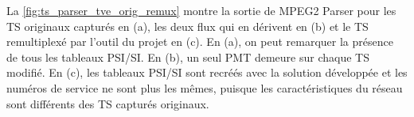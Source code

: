 \documentclass[12pt,a4paper]{article}
\begin{document}

La \autoref{fig:ts_parser_tve_orig_remux} montre la sortie de MPEG2 Parser pour les TS originaux capturés en (a), les deux flux qui en dérivent en (b) et le TS remultiplexé par l'outil du projet en (c). En (a), on peut remarquer la présence de tous les tableaux PSI/SI. En (b), un seul PMT demeure sur chaque TS modifié. En (c), les tableaux PSI/SI sont recréés avec la solution développée et les numéros de service ne sont plus les mêmes, puisque les caractéristiques du réseau sont différents des TS capturés originaux.



\end{document}
